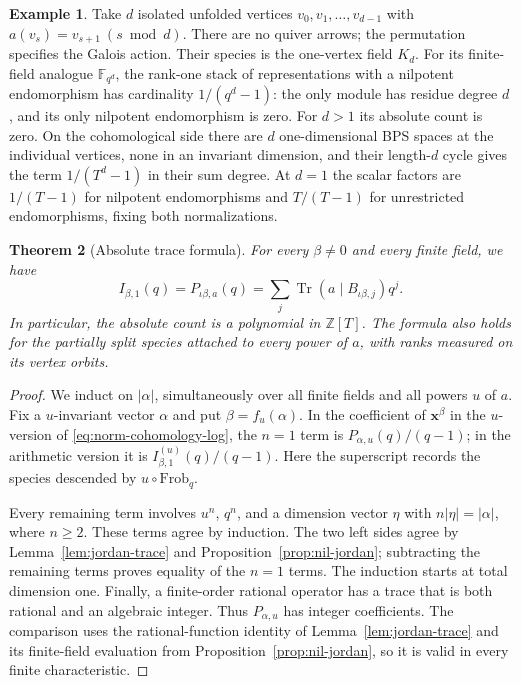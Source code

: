 \documentclass[11pt, reqno]{amsart}
\numberwithin{equation}{section}
\newtheorem{theorem}{Theorem}[section]
\theoremstyle{definition}
\newtheorem{example}[theorem]{Example}
\theoremstyle{remark}
\newcommand{\op}[1]{\operatorname{#1}}
\newcommand{\mr}[1]{\mathrm{#1}}
\newcommand{\mb}[1]{\mathbb{#1}}
\newcommand{\Tr}{\op{Tr}}
\begin{document}
\begin{example}\label{ex:vertex-orbit-trace}
Take $d$ isolated unfolded vertices $v_0,v_1,\dots,v_{d-1}$ with $a(v_s)=v_{s+1}\ (s\bmod d)$.
There are no quiver arrows; the permutation specifies the Galois
action. Their species is the one-vertex field $K_d$. For its finite-field analogue $\mb F_{q^d}$, the rank-one
stack of representations with a nilpotent endomorphism has cardinality $1/(q^d-1)$: the only module has
residue degree $d$, and its only nilpotent endomorphism is zero.
For $d>1$ its absolute count is zero. On the cohomological side
there are $d$ one-dimensional BPS spaces at the individual vertices,
none in an invariant dimension, and their length-$d$ cycle gives the term $1/(T^d-1)$ in their sum degree. At $d=1$ the scalar factors are
$1/(T-1)$ for nilpotent endomorphisms and $T/(T-1)$ for unrestricted
endomorphisms, fixing both normalizations.
\end{example}

\begin{theorem}[Absolute trace formula]\label{thm:allrank-absolute}
For every $\beta\ne0$ and every finite field, we have
\[ I_{\beta,1}(q)=P_{\iota\beta,a}(q) =\sum_j\Tr(a\mid B_{\iota\beta,j})q^j. \]
In particular, the absolute count is a polynomial in $\mb Z[T]$.
The formula also holds for the partially split species attached to
every power of $a$, with ranks measured on its vertex orbits.
\end{theorem}
\begin{proof}
We induct on $|\alpha|$, simultaneously over all finite fields and
all powers $u$ of $a$. Fix a $u$-invariant vector $\alpha$ and put
$\beta=f_u(\alpha)$. In the coefficient of $\mathbf x^\beta$ in the
$u$-version of \eqref{eq:norm-cohomology-log}, the $n=1$ term is
$P_{\alpha,u}(q)/(q-1)$; in the arithmetic version it is
$I^{(u)}_{\beta,1}(q)/(q-1)$. Here the superscript records the
species descended by $u\circ\mr{Frob}_q$.

Every remaining term involves $u^n$, $q^n$, and a dimension vector
$\eta$ with $n|\eta|=|\alpha|$, where $n\ge2$. These terms agree by
induction. The two left sides agree by Lemma~\ref{lem:jordan-trace}
and Proposition~\ref{prop:nil-jordan}; subtracting the remaining
terms proves equality of the $n=1$ terms. The induction starts at
total dimension one. Finally, a finite-order rational operator has a trace that is both rational and an algebraic integer.
Thus $P_{\alpha,u}$ has integer coefficients.
The comparison uses the rational-function identity of
Lemma~\ref{lem:jordan-trace} and its finite-field evaluation from
Proposition~\ref{prop:nil-jordan}, so it is valid in every finite
characteristic.
\end{proof}
\end{document}
